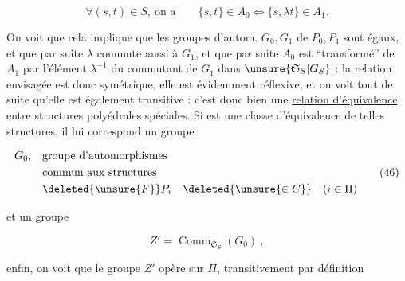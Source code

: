 
\[
\forall(s,t)\in S,\ \text{on a}\qquad
 \{s,t\}\in A_0\Longleftrightarrow\{s,\lambda t\}\in A_1.
\tag*{$(45)$}
\]

On voit que cela implique que  les groupes d'autom. $G_0,G_1$ de $P_0,P_1$ sont égaux, et que par suite $\lambda$  commute aussi à $G_{1}$, et que  par suite $A_0$ est ``transformé'' de $A_1$ par l'élément $\lambda^{-1}$ du commutant de $G_1$ dans $\unsure{\mathfrak S_S|G_S}$ : la relation envisagée est donc symétrique, elle est évidemment réflexive, et on voit tout de suite qu'elle est également transitive :  c'est donc bien une \uline{relation d'équivalence} entre structures polyédrales spéciales. Si  \inserted{$\Pi$} est une classe d'équivalence de telles structures, il lui correspond un groupe


\[
\begin{aligned}
 G_0,\quad &\text{groupe d'automorphismes}\\
 &\text{commun aux structures}\\
 &\deleted{\unsure{F}}P_i\quad\deleted{\unsure{\in C}}\quad(i\in\Pi)
\end{aligned}\tag*{$(46)$}
\]

et un groupe

\[
 Z'=\operatorname{Comm}_{\mathfrak S_S}(G_0)\ ,
\tag*{$(47)$}
\]

enfin, on voit que le groupe $Z'$ opère sur $\Pi$, transitivement par définition
